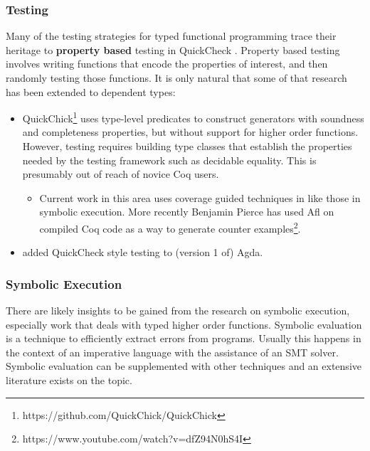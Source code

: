 \subsubsection{Testing}
 
Many of the testing strategies for typed functional programming trace their heritage to \textbf{property based} testing in QuickCheck \cite{quickcheck}.
Property based testing involves writing functions that encode the properties of interest, and then randomly testing those functions.
It is only natural that some of that research has been extended to dependent types:
\begin{itemize}
\item
QuickChick\footnote{https://github.com/QuickChick/QuickChick} \cite{denes2014quickchick,lampropoulos2017generating,lampropoulos2017beginner,lampropoulos2018random}
 uses type-level predicates to construct generators with soundness and completeness properties, but without support for higher order functions.
However, testing requires building type classes that establish the properties needed by the testing framework such as decidable equality.
This is presumably out of reach of novice Coq users.
\begin{itemize}
\item
Current work in this area uses coverage guided techniques in \cite{lampropoulos2019coverage} like those in symbolic execution.
More recently Benjamin Pierce has used Afl on compiled Coq code as a way to generate counter examples\footnote{https://www.youtube.com/watch?v=dfZ94N0hS4I}.
\end{itemize}
\item \cite{dybjer2003combining} added QuickCheck style testing to (version 1 of) Agda.
\end{itemize}
 
\subsubsection{Symbolic Execution}
 
There are likely insights to be gained from the research on symbolic execution, especially work that deals with typed higher order functions.
Symbolic evaluation is a technique to efficiently extract errors from programs.
Usually this happens in the context of an imperative language with the assistance of an SMT solver.
Symbolic evaluation can be supplemented with other techniques and an extensive literature exists on the topic.
 
